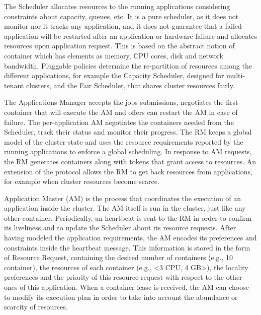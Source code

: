 The Scheduler allocates resources to the running applications considering constraints about capacity, queues, etc. It is a pure scheduler, as it does not monitor nor it tracks any application, and it does not guarantee that a failed application will be restarted after an application or hardware failure and allocates resources upon application request. This is based on the abstract notion of container which has elements as memory, CPU cores, disk and network bandwidth. Pluggable policies determine the re-partition of resources among the different applications, for example the Capacity Scheduler, designed for multi-tenant clusters, and the Fair Scheduler, that shares cluster resources fairly. 

The Applications Manager accepts the jobs submissions, negotiates the first container that will execute the AM and offers can restart the AM in case of failure. The per-application AM negotiates the containers needed from the Scheduler, track their status and monitor their progress. The RM keeps a global model of the cluster state and uses the resource requirements reported by the running applications to enforce a global scheduling.  In response to AM requests, the RM generates containers along with tokens that grant access to resources. An extension of the protocol allows the RM to get back resources from applications, for example when cluster resources become scarce. 

Application Master (AM) is the process that coordinates the execution of an application inside the cluster. The AM itself is run in the cluster, just like any other container. Periodically, an heartbeat is sent to the RM in order to confirm its liveliness and to update the Scheduler about its resource requests. After having modeled the application requirements, the AM encodes its preferences and constraints inside the heartbeat message. This information is stored in the form of Resource Request, containing the desired number of containers (e.g., 10 container), the resources of each container (e.g., <3 CPU, 4 GB>), the locality preferences and the priority of this resource request with respect to the other ones of this application. When a container lease is received, the AM can choose to modify its execution plan in order to take into account the abundance or scarcity of resources. 

